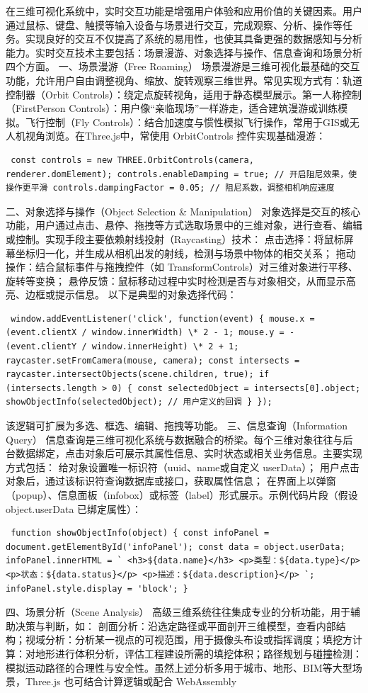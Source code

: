 {{在三维可视化系统中，实时交互功能是增强用户体验和应用价值的关键因素。用户通过鼠标、键盘、触摸等输入设备与场景进行交互，完成观察、分析、操作等任务。实现良好的交互不仅提高了系统的易用性，也使其具备更强的数据感知与分析能力。实时交互技术主要包括：场景漫游、对象选择与操作、信息查询和场景分析四个方面。 一、场景漫游（Free Roaming） 场景漫游是三维可视化最基础的交互功能，允许用户自由调整视角、缩放、旋转观察三维世界。常见实现方式有：轨道控制器（Orbit Controls）：绕定点旋转视角，适用于静态模型展示。第一人称控制（FirstPerson Controls）：用户像``亲临现场''一样游走，适合建筑漫游或训练模拟。飞行控制（Fly Controls）：结合加速度与惯性模拟飞行操作，常用于GIS或无人机视角浏览。在Three.js中，常使用 OrbitControls 控件实现基础漫游： \begin{verbatim} const controls = new THREE.OrbitControls(camera, renderer.domElement); controls.enableDamping = true; // 开启阻尼效果，使操作更平滑 controls.dampingFactor = 0.05; // 阻尼系数，调整相机响应速度 \end{verbatim} 二、对象选择与操作（Object Selection \& Manipulation） 对象选择是交互的核心功能，用户通过点击、悬停、拖拽等方式选取场景中的三维对象，进行查看、编辑或控制。实现手段主要依赖射线投射（Raycasting）技术： 点击选择：将鼠标屏幕坐标归一化，并生成从相机出发的射线，检测与场景中物体的相交关系； 拖动操作：结合鼠标事件与拖拽控件（如 TransformControls）对三维对象进行平移、旋转等变换； 悬停反馈：鼠标移动过程中实时检测是否与对象相交，从而显示高亮、边框或提示信息。 以下是典型的对象选择代码： \begin{verbatim} window.addEventListener('click', function(event) { mouse.x = (event.clientX / window.innerWidth) \* 2 - 1; mouse.y = -(event.clientY / window.innerHeight) \* 2 + 1; raycaster.setFromCamera(mouse, camera); const intersects = raycaster.intersectObjects(scene.children, true); if (intersects.length > 0) { const selectedObject = intersects[0].object; showObjectInfo(selectedObject); // 用户定义的回调 } }); \end{verbatim} 该逻辑可扩展为多选、框选、编辑、拖拽等功能。 三、信息查询（Information Query） 信息查询是三维可视化系统与数据融合的桥梁。每个三维对象往往与后台数据绑定，点击对象后可展示其属性信息、实时状态或相关业务信息。主要实现方式包括： 给对象设置唯一标识符（uuid、name或自定义 userData）； 用户点击对象后，通过该标识符查询数据库或接口，获取属性信息； 在界面上以弹窗（popup）、信息面板（infobox）或标签（label）形式展示。示例代码片段（假设 object.userData 已绑定属性）： \begin{verbatim} function showObjectInfo(object) { const infoPanel = document.getElementById('infoPanel'); const data = object.userData; infoPanel.innerHTML = ` <h3>${data.name}</h3> <p>类型：${data.type}</p> <p>状态：${data.status}</p> <p>描述：${data.description}</p> `; infoPanel.style.display = 'block'; } \end{verbatim} 四、场景分析（Scene Analysis） 高级三维系统往往集成专业的分析功能，用于辅助决策与判断，如： 剖面分析：沿选定路径或平面剖开三维模型，查看内部结构；视域分析：分析某一视点的可视范围，用于摄像头布设或指挥调度；填挖方计算：对地形进行体积分析，评估工程建设所需的填挖体积；路径规划与碰撞检测：模拟运动路径的合理性与安全性。虽然上述分析多用于城市、地形、BIM等大型场景，Three.js 也可结合计算逻辑或配合 WebAssembly }}
